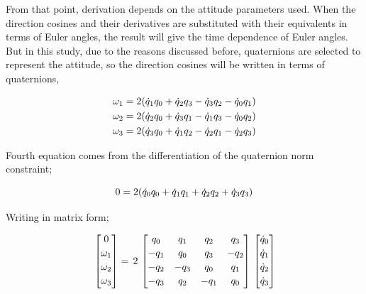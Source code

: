 From that point, derivation depends on the attitude parameters used. 
When the direction cosines and their derivatives are substituted with their equivalents in terms of Euler angles, the result will give the time dependence of Euler angles. 
But in this study, due to the reasons discussed before, quaternions are selected to represent the attitude, so the direction cosines will be written in terms of quaternions,

\begin{align}{\label{eqn:angVelocityQuaternion}}
\begin{split}
\omega_1 & = 2 (\dot{q}_1 q_0 + \dot{q}_2 q_3 - \dot{q}_3 q_2 - \dot{q}_0 q_1) \\
\omega_2 & = 2 (\dot{q}_2 q_0 + \dot{q}_3 q_1 - \dot{q}_1 q_3 - \dot{q}_0 q_2) \\
\omega_3 & = 2 (\dot{q}_3 q_0 + \dot{q}_1 q_2 - \dot{q}_2 q_1 - \dot{q}_2 q_3)\\
\end{split}
\end{align}

Fourth equation comes from the differentiation of the quaternion norm constraint;

\begin{equation}{\label{eqn:kinematicEquDQM}}
0 = 2 ( \dot{q}_0 q_0 + \dot{q}_1 q_1 + \dot{q}_2 q_2 + \dot{q}_3 q_3)
\end{equation}

Writing in matrix form;

\begin{equation}{\label{eqn:kinematicEquAngVel}}
\begin{bmatrix}
0\\[0.2em]
\omega_1\\[0.2em]
\omega_2\\[0.2em]
\omega_3\\[0.2em]
\end{bmatrix}
 =\,
 2\,
\begin{bmatrix}
q_0 & q_1 & q_2 & q_3 \\[0.2em]
-q_1 & q_0 & q_3 & -q_2 \\[0.2em]
-q_2 & -q_3 & q_0 & q_1 \\[0.2em]
-q_3 & q_2 & -q_1 & q_0 \\[0.2em]
\end{bmatrix}
\,
\begin{bmatrix}
\dot{q}_0\\[0.2em]
\dot{q}_1\\[0.2em]
\dot{q}_2\\[0.2em]
\dot{q}_3\\[0.2em]
\end{bmatrix}
\end{equation}
 
